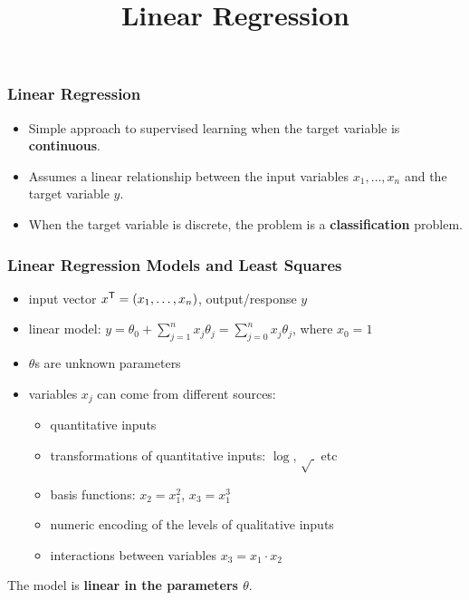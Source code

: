 \documentclass[xcolor=table]{beamer}
\title{Linear Regression}
\newcommand{\trans}[1]{\ensuremath{#1}^{\scriptsize{\textsf{T}}}}
\begin{document}
\maketitle

\begin{frame}[t]
  \frametitle{Linear Regression}  
\begin{itemize}
    \item Simple approach to supervised learning when the target variable is 
        \textbf{continuous}.
    \item Assumes a linear relationship between the input variables 
        $x_1, \ldots, x_n$ and the target variable $y$.
    \item  When the target variable is discrete, the problem is a
    \textbf{classification}
        problem. 
  \end{itemize}
\end{frame}


\begin{frame}[t]
\frametitle{Linear Regression Models and Least Squares}
\begin{itemize}
    \item input vector $\trans{x} = (x_1, \ldots, x_n)$, output/response $y$
    \item linear model: $y = \theta_0 + \sum_{j=1}^{n} x_j \theta_j = \sum_{j = 0}^n
    x_j \theta_j$, where $x_0 = 1$
    \item $\theta$s are unknown parameters
    \item variables $x_j$ can come from different sources:
        \begin{itemize}
            \item quantitative inputs
            \item transformations of quantitative inputs: $\log$, $\sqrt{~}$ etc
            \item basis functions: $x_2 = x_1^2$, $x_3 = x_1^3$
            \item numeric encoding of the levels of qualitative inputs
            \item interactions between variables $x_3 = x_1 \cdot x_2$
        \end{itemize}
\end{itemize}
The model is \textbf{linear in the parameters $\theta$}.
\end{frame}
\end{document}
